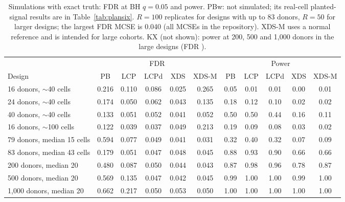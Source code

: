 \begin{table}[t]\centering\small\setlength{\tabcolsep}{3pt}\caption{Simulations with exact truth: FDR at BH $q=0.05$ and power. PBw: not simulated; its real-cell planted-signal results are in Table~\ref{tab:plansix}. $R=100$ replicates for designs with up to 83 donors, $R=50$ for larger designs; the largest FDR MCSE is 0.040 (all MCSEs in the repository). XDS-M uses a normal reference and is intended for large cohorts. KX (not shown): power \KXpowList{} at 200, 500 and 1{,}000 donors in the large designs (FDR \KXfdrList).}\label{tab:sim}
\begin{tabular}{lcccccccccc}\toprule & \multicolumn{5}{c}{FDR} & \multicolumn{5}{c}{Power}\\\cmidrule(lr){2-6}\cmidrule(lr){7-11}
Design & PB & LCP & LCPd & XDS & XDS-M & PB & LCP & LCPd & XDS & XDS-M\\\midrule
16 donors, $\sim$40 cells & 0.216 & 0.110 & 0.086 & 0.025 & 0.265 & 0.05 & 0.01 & 0.01 & 0.00 & 0.01 \\
24 donors, $\sim$40 cells & 0.174 & 0.050 & 0.062 & 0.043 & 0.135 & 0.18 & 0.12 & 0.10 & 0.02 & 0.02 \\
40 donors, $\sim$40 cells & 0.133 & 0.051 & 0.052 & 0.041 & 0.052 & 0.50 & 0.50 & 0.44 & 0.16 & 0.11 \\
16 donors, $\sim$100 cells & 0.122 & 0.039 & 0.037 & 0.049 & 0.213 & 0.19 & 0.09 & 0.08 & 0.03 & 0.02 \\
79 donors, median 15 cells & 0.594 & 0.077 & 0.049 & 0.041 & 0.031 & 0.32 & 0.40 & 0.32 & 0.07 & 0.09 \\
83 donors, median 43 cells & 0.179 & 0.051 & 0.047 & 0.048 & 0.045 & 0.88 & 0.93 & 0.90 & 0.66 & 0.66 \\
200 donors, median 20 & 0.480 & 0.087 & 0.050 & 0.044 & 0.043 & 0.87 & 0.98 & 0.96 & 0.78 & 0.87 \\
500 donors, median 20 & 0.569 & 0.135 & 0.047 & 0.042 & 0.045 & 0.99 & 1.00 & 1.00 & 0.99 & 1.00 \\
1,000 donors, median 20 & 0.662 & 0.217 & 0.050 & 0.053 & 0.050 & 1.00 & 1.00 & 1.00 & 1.00 & 1.00 \\
\bottomrule\end{tabular}\end{table}
